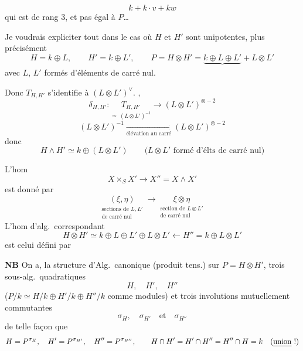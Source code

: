 \documentclass[11pt,a4paper]{article}
\begin{document}
\[
  k + k\cdot v + kw
\]
qui est de rang $3$, et pas égal à $P$…

Je voudrais expliciter tout dans le cas où $H$ et $H'$ sont unipotentes, plus précisément
\[
  H = k \oplus L, \qquad H' = k \oplus L', \qquad
  P = H \otimes H' = \underbrace{k \oplus L \oplus L'}_{} + L \otimes L'
\]
avec $L$, $L'$ formés d'éléments de carré nul.


Donc \struck{\ill{}} $T_{H,H'}$ s'identifie  à $(L \otimes L')^\vee$. ,
\[
  \delta_{H,H'} : \underset{\displaystyle\simeq\ (L \otimes L')^{-1}}{T_{H,H'}} \longrightarrow (L \otimes L')^{\otimes -2}
\]
\[
  (L \otimes L')^{-1} \xrightarrow[\text{élévation au carré}]{} (L \otimes L')^{\otimes -2}
\]
donc
\[
  H \wedge H' \simeq k \oplus (L \otimes L') \qquad \text{($L \otimes L'$ formé d'élts de carré nul)}
\]


L'hom
\[
  X \times_S X' \longrightarrow X'' = X \wedge X'
\]
est donné par
\[
  \underset{\substack{\text{sections de } L, L' \\ \text{de carré nul}}}{(\xi, \eta)} \longrightarrow \underset{\substack{\text{section de } L \otimes L' \\ \text{de carré nul}}}{\xi \otimes \eta}
\]
L'hom d'alg.\ correspondant
\[
  H \otimes H' \simeq k \oplus L \oplus L' \oplus L \otimes L' \longleftarrow H'' = k \oplus L \otimes L'
\]
est celui défini par

\textbf{NB} On a,  la structure d'Alg.\ canonique  (produit tens.) sur $P = H \otimes H'$, trois sous-alg.\ quadratiques
\[
  H, \quad H', \quad H''
\]
($P/k \simeq H/k \oplus H'/k \oplus H''/k$ comme modules) et trois involutions mutuellement commutantes
\[
  \sigma_H, \quad \sigma_{H'} \quad \text{et} \quad \sigma_{H''}
\]
de telle façon que
\[
  H = P^{\sigma_H}, \quad H' = P^{\sigma_{H'}}, \quad H'' = P^{\sigma_{H''}}, \qquad
  H \cap H' = H' \cap H'' = H'' \cap H = k \quad (\text{\uncertain{union} !})
\]
\end{document}
